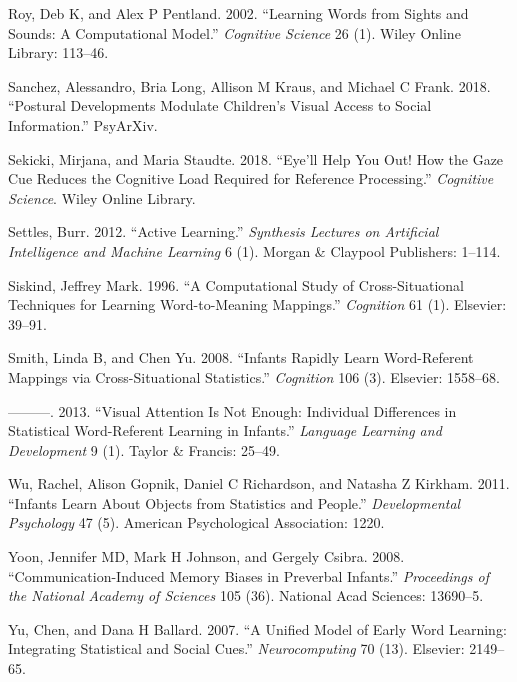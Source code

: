 \documentclass[10pt, letterpaper]{article}
\begin{document}
\leavevmode\hypertarget{ref-roy2002learning}{}%
Roy, Deb K, and Alex P Pentland. 2002. ``Learning Words from Sights and
Sounds: A Computational Model.'' \emph{Cognitive Science} 26 (1). Wiley
Online Library: 113--46.

\leavevmode\hypertarget{ref-sanchez2018postural}{}%
Sanchez, Alessandro, Bria Long, Allison M Kraus, and Michael C Frank.
2018. ``Postural Developments Modulate Children's Visual Access to
Social Information.'' PsyArXiv.

\leavevmode\hypertarget{ref-sekicki2018eye}{}%
Sekicki, Mirjana, and Maria Staudte. 2018. ``Eye'll Help You Out! How
the Gaze Cue Reduces the Cognitive Load Required for Reference
Processing.'' \emph{Cognitive Science}. Wiley Online Library.

\leavevmode\hypertarget{ref-settles2012active}{}%
Settles, Burr. 2012. ``Active Learning.'' \emph{Synthesis Lectures on
Artificial Intelligence and Machine Learning} 6 (1). Morgan \& Claypool
Publishers: 1--114.

\leavevmode\hypertarget{ref-siskind1996computational}{}%
Siskind, Jeffrey Mark. 1996. ``A Computational Study of
Cross-Situational Techniques for Learning Word-to-Meaning Mappings.''
\emph{Cognition} 61 (1). Elsevier: 39--91.

\leavevmode\hypertarget{ref-smith2008infants}{}%
Smith, Linda B, and Chen Yu. 2008. ``Infants Rapidly Learn Word-Referent
Mappings via Cross-Situational Statistics.'' \emph{Cognition} 106 (3).
Elsevier: 1558--68.

\leavevmode\hypertarget{ref-smith2013visual}{}%
---------. 2013. ``Visual Attention Is Not Enough: Individual
Differences in Statistical Word-Referent Learning in Infants.''
\emph{Language Learning and Development} 9 (1). Taylor \& Francis:
25--49.

\leavevmode\hypertarget{ref-wu2011infants}{}%
Wu, Rachel, Alison Gopnik, Daniel C Richardson, and Natasha Z Kirkham.
2011. ``Infants Learn About Objects from Statistics and People.''
\emph{Developmental Psychology} 47 (5). American Psychological
Association: 1220.

\leavevmode\hypertarget{ref-yoon2008communication}{}%
Yoon, Jennifer MD, Mark H Johnson, and Gergely Csibra. 2008.
``Communication-Induced Memory Biases in Preverbal Infants.''
\emph{Proceedings of the National Academy of Sciences} 105 (36).
National Acad Sciences: 13690--5.

\leavevmode\hypertarget{ref-yu2007unified}{}%
Yu, Chen, and Dana H Ballard. 2007. ``A Unified Model of Early Word
Learning: Integrating Statistical and Social Cues.''
\emph{Neurocomputing} 70 (13). Elsevier: 2149--65.
\end{document}
